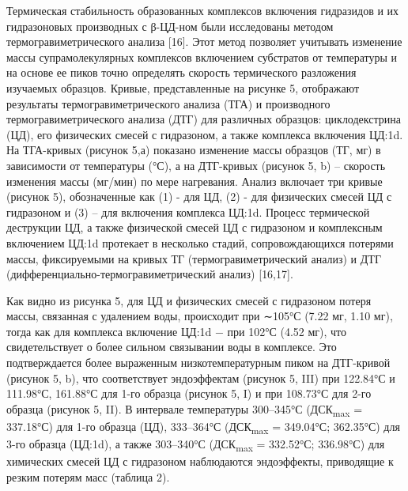 \begin{multicols}{2}
Термическая стабильность образованных комплексов включения гидразидов и
их гидразоновых производных с β-ЦД-ном были исследованы методом
термогравиметрического анализа {[}16{]}. Этот метод позволяет учитывать
изменение массы супрамолекулярных комплексов включением субстратов от
температуры и на основе ее пиков точно определять скорость термического
разложения изучаемых образцов. Кривые, представленные на рисунке 5,
отображают результаты термогравиметрического анализа (ТГА) и
производного термогравиметрического анализа (ДТГ) для различных
образцов: циклодекстрина (ЦД), его физических смесей с гидразоном, а
также комплекса включения ЦД:1d. На ТГА-кривых (рисунок 5,а) показано
изменение массы образцов (ТГ, мг) в зависимости от температуры (°С), а
на ДТГ-кривых (рисунок 5, b) -- скорость изменения массы (мг/мин) по
мере нагревания. Анализ включает три кривые (рисунок 5), обозначенные
как (1) - для ЦД, (2) - для физических смесей ЦД с гидразоном и (3) --
для включения комплекса ЦД:1d. Процесс термической деструкции ЦД, а
также физической смесей ЦД с гидразоном и комплексным включением ЦД:1d
протекает в несколько стадий, сопровождающихся потерями массы,
фиксируемыми на кривых ТГ (термогравиметрический анализ) и ДТГ
(дифференциально-термогравиметрический анализ) {[}16,17{]}.

Как видно из рисунка 5, для ЦД и физических смесей с гидразоном потеря
массы, связанная с удалением воды, происходит при ∼105°С (7.22 мг, 1.10
мг), тогда как для комплекса включение ЦД:1d − при 102°С (4.52 мг), что
свидетельствует о более сильном связывании воды в комплексе. Это
подтверждается более выраженным низкотемпературным пиком на ДТГ-кривой
(рисунок 5, b), что соответствует эндоэффектам (рисунок 5, III) при
122.84°С и 111.98°С, 161.88°С для 1-го образца (рисунок 5, I) и при
108.73°С для 2-го образца (рисунок 5, II). В интервале температуры
300--345°С (ДСК\textsubscript{max} = 337.18°С) для 1-го образца (ЦД),
333--364°С (ДСК\textsubscript{max} = 349.04°С; 362.35°С) для 3-го
образца (ЦД:1d), а также 303--340°С (ДСК\textsubscript{max} = 332.52°С;
336.98°С) для химических смесей ЦД с гидразоном наблюдаются эндоэффекты,
приводящие к резким потерям масс (таблица 2).
\end{multicols}


